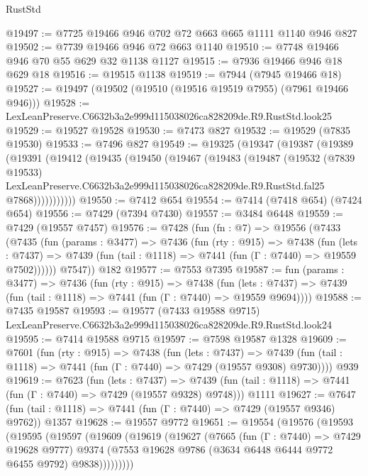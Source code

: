 \begin{lexlean}{RustStd}
\begin{coremodule}
@19497 := @7725 @19466 @946 @702 @72 @663 @665 @1111 @1140 @946 @827
@19502 := @7739 @19466 @946 @72 @663 @1140
@19510 := @7748 @19466 @946 @70 @55 @629 @32 @1138 @1127
@19515 := @7936 @19466 @946 @18 @629 @18
@19516 := @19515 @1138
@19519 := @7944 (@7945 @19466 @18)
@19527 := @19497 (@19502 (@19510 (@19516 @19519 @7955) (@7961 @19466 @946)))
@19528 := LexLeanPreserve.C6632b3a2e999d115038026ca828209de.R9.RustStd.look25
@19529 := @19527 @19528
@19530 := @7473 @827
@19532 := @19529 (@7835 @19530)
@19533 := @7496 @827
@19549 := @19325
    (@19347
      (@19387
        (@19389
          (@19391
            (@19412
              (@19435
                (@19450
                  (@19467
                    (@19483
                      (@19487
                        (@19532
                          (@7839 @19533)
                          LexLeanPreserve.C6632b3a2e999d115038026ca828209de.R9.RustStd.fal25
                          @7868)))))))))))
@19550 := @7412 @654
@19554 := @7414 (@7418 @654) (@7424 @654)
@19556 := @7429 (@7394 @7430)
@19557 := @3484 @6448
@19559 := @7429 (@19557 @7457)
@19576 := @7428
    (fun (fn : @7) =>
    @19556
      (@7433
        (@7435
          (fun (params : @3477) =>
          @7436
            (fun (rty : @915) =>
            @7438
              (fun (lets : @7437) =>
              @7439 (fun (tail : @1118) => @7441 (fun (Γ : @7440) => @19559 @7502))))))
        @7547))
    @182
@19577 := @7553 @7395
@19587 := fun (params : @3477) =>
  @7436
    (fun (rty : @915) =>
    @7438
      (fun (lets : @7437) => @7439 (fun (tail : @1118) => @7441 (fun (Γ : @7440) => @19559 @9694))))
@19588 := @7435 @19587
@19593 := @19577
    (@7433 @19588 @9715)
    LexLeanPreserve.C6632b3a2e999d115038026ca828209de.R9.RustStd.look24
@19595 := @7414 @19588 @9715
@19597 := @7598 @19587 @1328
@19609 := @7601
    (fun (rty : @915) =>
    @7438
      (fun (lets : @7437) =>
      @7439 (fun (tail : @1118) => @7441 (fun (Γ : @7440) => @7429 (@19557 @9308) @9730))))
    @939
@19619 := @7623
    (fun (lets : @7437) =>
    @7439 (fun (tail : @1118) => @7441 (fun (Γ : @7440) => @7429 (@19557 @9328) @9748)))
    @1111
@19627 := @7647 (fun (tail : @1118) => @7441 (fun (Γ : @7440) => @7429 (@19557 @9346) @9762)) @1357
@19628 := @19557 @9772
@19651 := @19554
    (@19576
      (@19593
        (@19595
          (@19597
            (@19609
              (@19619
                (@19627
                  (@7665
                    (fun (Γ : @7440) => @7429 @19628 @9777)
                    @9374
                    (@7553 @19628 @9786 (@3634 @6448 @6444 @9772 @6455 @9792) @9838)))))))))

\end{coremodule}
\end{lexlean}
